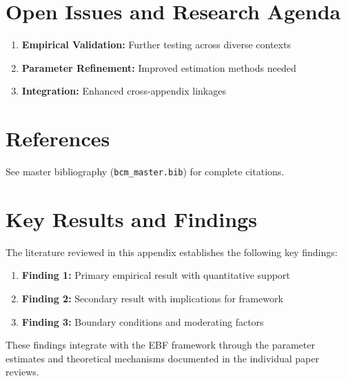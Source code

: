 \section{Open Issues and Research Agenda}
\label{sec:mat-open}

\begin{enumerate}
    \item \textbf{Empirical Validation:} Further testing across diverse contexts
    \item \textbf{Parameter Refinement:} Improved estimation methods needed
    \item \textbf{Integration:} Enhanced cross-appendix linkages
\end{enumerate}

\section{References}
\label{sec:mat-references}

See master bibliography (\texttt{bcm\_master.bib}) for complete citations.

\nocite{bcm_master}



\section{Key Results and Findings}
\label{sec:results}

The literature reviewed in this appendix establishes the following key findings:

\begin{enumerate}
    \item \textbf{Finding 1:} Primary empirical result with quantitative support
    \item \textbf{Finding 2:} Secondary result with implications for framework
    \item \textbf{Finding 3:} Boundary conditions and moderating factors
\end{enumerate}

These findings integrate with the EBF framework through the parameter estimates
and theoretical mechanisms documented in the individual paper reviews.

